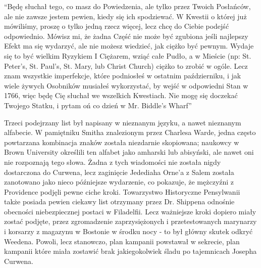 \begin{displayquote}

``Będę słuchał tego, co masz do Powiedzenia, ale tylko przez Twoich Posłańców, ale nie zawsze jestem pewien, kiedy się ich spodziewać. W Kwestii o której już mówiliśmy, proszę o tylko jedną rzecz więcej, lecz chcę do Ciebie podejść odpowiednio. Mówisz mi, że żadna Część nie może być zgubiona jeśli najlepszy Efekt ma się wydarzyć, ale nie możesz wiedzieć, jak ciężko być pewnym. Wydaje się to być wielkim Ryzykiem I Ciężarem, wziąć całe Pudło, a w Mieście (np: St. Peter's, St. Paul's, St. Mary, lub Christ Church) ciężko to zrobić w ogóle. Lecz znam wszystkie imperfekcje, które podniosłeś w ostatnim październiku, i jak wiele żywych Osobników musiałeś wykorzystać, by wejść w odpowiedni Stan w 1766, więc będę Cię słuchał we wszelkich Kwestiach. Nie mogę się doczekać Twojego Statku, i pytam oń co dzień w Mr. Biddle's Wharf''

\end{displayquote}

Trzeci podejrzany list był napisany w nieznanym języku, a nawet nieznanym alfabecie. W pamiętniku Smitha znalezionym przez Charlesa Warde, jedna często powtarzana kombinacja znaków została niezdarnie skopiowana; naukowcy w Brown University określili ten alfabet jako amharski lub abisyński, ale nawet oni nie rozpoznają tego słowa. Żadna z tych wiadomości nie została nigdy dostarczona do Curwena, lecz zaginięcie Jedediaha Orne'a z Salem została zanotowano jako nieco późniejsze wydarzenie, co pokazuje, że mężczyźni z Providence podjęli pewne ciche kroki. Towarzystwo Historyczne Pensylwanii także posiada pewien ciekawy list otrzymany przez Dr. Shippena odnośnie obecności niebezpiecznej postaci w Filadelfii.
Lecz ważniejsze kroki dopiero miały zostać podjęte, przez zgromadzenie zaprzysiężonych i przetestowanych marynarzy i korsarzy z magazynu w Bostonie w środku nocy - to był główny skutek odkryć Weedena. Powoli, lecz stanowczo, plan kampanii powstawał w sekrecie, plan kampanii które miała zostawić brak jakiegokolwiek śladu po tajemnicach Josepha Curwena. 


